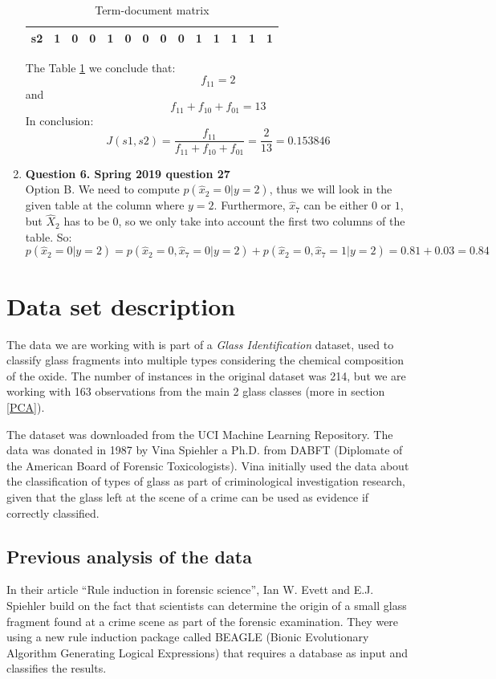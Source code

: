 \documentclass[12pt]{article}
\begin{document}
\begin{enumerate}
\begin{table}[H]
\begin{tabular}{|c|c|c|c|c|c|c|c|c|c|c|c|c|c|}
s2 & 1 & 0 & 0 & 1 & 0 & 0 & 0 & 0 & 1 & 1 & 1 & 1 & 1 \\
\hline
\end{tabular}
\caption{Term-document matrix}
\label{table:5}
\end{table}
The Table \ref{table:5} we conclude that: \begin{equation*} f_{11} = 2 \end{equation*} and \begin{equation*} f_{11} + f_{10} + f_{01} = 13 \end{equation*}
In conclusion:
\begin{equation*} J(s1, s2) = \frac{f_{11}}{f_{11} + f_{10} + f_{01}} = \frac{2}{13}=0.153846\end{equation*}
  \item \textbf{Question 6. Spring 2019 question 27} \\
  Option B. We need to compute $p(\hat{x}_2 = 0| y = 2)$, thus we will look in the given table at the column where $y = 2$. Furthermore, $\hat{x}_7$ can be either $0$ or $1$, but $\hat{X}_2$ has to be $0$, so we only take into account the first two columns of the table. So:
  \begin{equation*}
      p(\hat{x}_2 = 0| y = 2) = p(\hat{x}_2 = 0, \hat{x}_7 = 0| y = 2) + p(\hat{x}_2 = 0, \hat{x}_7 = 1| y = 2) = 0.81 + 0.03 = 0.84
  \end{equation*}
\end{enumerate}
\clearpage
\setcounter{page}{1}

\section{Data set description}
The data we are working with is part of a \textit{Glass Identification} dataset, used to classify glass fragments into multiple types considering the chemical composition of the oxide. 
The number of instances in the original dataset was 214, but we are working with 163 observations from the main 2 glass classes (more in section \ref{PCA}). 

The dataset was downloaded from the UCI Machine Learning Repository\cite{data_set_source}. The data was donated in 1987 by Vina Spiehler a Ph.D. from DABFT (Diplomate of the American Board of Forensic Toxicologists). Vina initially used the data about the classification of types of glass as part of criminological investigation research, given that the glass left at the scene of a crime can be used as evidence if correctly classified.
\subsection{Previous analysis of the data}
In their article “Rule induction in forensic science”\cite{rule_induction_article}, Ian W. Evett and E.J. Spiehler build on the fact that scientists can determine the origin of a small glass fragment found at a crime scene as part of the forensic examination. They were using a new rule induction package called BEAGLE (Bionic Evolutionary Algorithm Generating Logical Expressions) that requires a database as input and classifies the results. 
\end{document}
